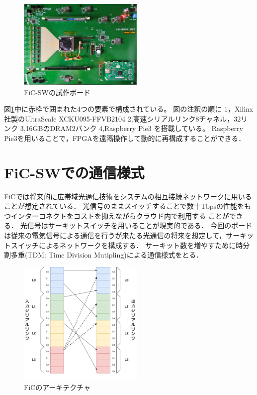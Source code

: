 {\begin{figure}[h]
  \centering
  \includegraphics[width=6cm]{./chap3/fig/ficsw.pdf}
  \caption{FiC-SWの試作ボード}
  \label{fig:ficsw}
\end{figure}

図\ref{fig:ficsw}中に赤枠で囲まれた4つの要素で構成されている。
図の注釈の順に
1，Xilinx社製のUltraScale XCKU095-FFVB2104
2,高速シリアルリンク8チャネル，32リンク
3,16GBのDRAM2バンク
4,Raspberry Pie3
を搭載している。
Raspberry Pie3を用いることで，FPGAを遠隔操作して動的に再構成することができる．
\section{FiC-SWでの通信様式}
\label{sec:ficsw_communication}
FiCでは将来的に広帯域光通信技術をシステムの相互接続ネットワークに用いることが想定されている．
光信号のままスイッチすることで数十Tbpsの性能をもつインターコネクトをコストを抑えながらクラウド内で利用する
ことができる．
光信号はサーキットスイッチを用いることが現実的である．
今回のボードは従来の電気信号による通信を行うが来たる光通信の将来を想定して，サーキットスイッチによるネットワークを構成する．
サーキット数を増やすために時分割多重(TDM: Time Division Mutipling)による通信様式をとる．


 \begin{figure}[h]
   \centering
   \includegraphics[width=6cm]{./chap3/fig/arch_sw.pdf}
   \caption{FiCのアーキテクチャ}
   \label{fig:arch-sw}
 \end{figure}

}
